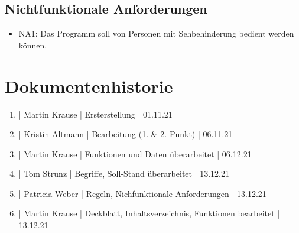 \documentclass[12pt]{scrartcl}
\begin{document}
\subsection{Nichtfunktionale Anforderungen}

\begin{itemize}
	\item NA1: Das Programm soll von Personen mit Sehbehinderung bedient werden können.
\end{itemize}

\section{Dokumentenhistorie}

\begin{enumerate}
	\item | Martin Krause | Ersterstellung | 01.11.21
	\item | Kristin Altmann | Bearbeitung (1. \& 2. Punkt) | 06.11.21
	\item | Martin Krause | Funktionen und Daten überarbeitet | 06.12.21
	\item | Tom Strunz | Begriffe, Soll-Stand überarbeitet | 13.12.21
	\item | Patricia Weber | Regeln, Nichfunktionale Anforderungen | 13.12.21
	\item | Martin Krause | Deckblatt, Inhaltsverzeichnis, Funktionen bearbeitet | 13.12.21
\end{enumerate}
 
\end{document}

